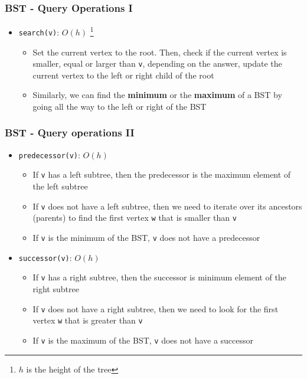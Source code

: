 \documentclass{beamer}
\begin{document}
\begin{frame}[fragile]
\frametitle{BST - Query Operations I}
	\begin{itemize}
	\item \verb|search(v)|: \color{blue} $O(h)$ \color{black} \footnote{$h$ is the height of the tree}
		\begin{itemize}
			\item Set the current vertex to the root. Then, check if the current vertex is smaller, equal or larger than \verb|v|, depending on the answer, update the current vertex to the left or right child of the root
			\item Similarly, we can find the \textbf{minimum} or the \textbf{maximum} of a BST by going all the way to the left or right of the BST
		\end{itemize}
	\end{itemize}
\end{frame}

\begin{frame}[fragile]
\frametitle{BST - Query operations II}
	\begin{itemize}
		\item \verb|predecessor(v)|: \color{blue} $O(h)$ \color{black}
			\begin{itemize}
				\item If \verb|v| has a left subtree, then the predecessor is the maximum element of the left subtree
				\item If \verb|v| does not have a left subtree, then we need to iterate over its ancestors (parents) to find the first vertex \verb|w| that is smaller than \verb|v|
				\item If \verb|v| is the minimum of the BST, \verb|v| does not have a predecessor
			\end{itemize}
		\item \verb|successor(v)|: \color{blue} $O(h)$ \color{black}
			\begin{itemize}
				\item If \verb|v| has a right subtree, then the successor is minimum element of the right subtree
				\item If \verb|v| does not have a right subtree, then we need to look for the first vertex \verb|w| that is greater than \verb|v|
				\item If \verb|v| is the maximum of the BST, \verb|v| does not have a successor
			\end{itemize}
	\end{itemize}
\end{frame}
\end{document}
